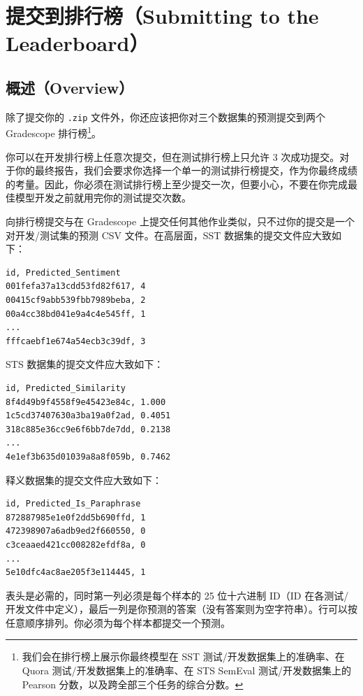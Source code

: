 \documentclass[11pt]{article}
\begin{document}
\section{提交到排行榜（Submitting to the Leaderboard）}

\subsection{概述（Overview）}

除了提交你的 \texttt{.zip} 文件外，你还应该把你对三个数据集的预测提交到两个 Gradescope 排行榜\footnote{我们会在排行榜上展示你最终模型在 SST 测试/开发数据集上的准确率、在 Quora 测试/开发数据集上的准确率、在 STS SemEval 测试/开发数据集上的 Pearson 分数，以及跨全部三个任务的综合分数。}。

你可以在开发排行榜上任意次提交，但在测试排行榜上只允许 3 次成功提交。对于你的最终报告，我们会要求你选择一个单一的测试排行榜提交，作为你最终成绩的考量。因此，你必须在测试排行榜上至少提交一次，但要小心，不要在你完成最佳模型开发之前就用完你的测试提交次数。

向排行榜提交与在 Gradescope 上提交任何其他作业类似，只不过你的提交是一个对开发/测试集的预测 CSV 文件。在高层面，SST 数据集的提交文件应大致如下：

\begin{lstlisting}[numbers=none]
id, Predicted_Sentiment
001fefa37a13cdd53fd82f617, 4
00415cf9abb539fbb7989beba, 2
00a4cc38bd041e9a4c4e545ff, 1
...
fffcaebf1e674a54ecb3c39df, 3
\end{lstlisting}

STS 数据集的提交文件应大致如下：

\begin{lstlisting}[numbers=none]
id, Predicted_Similarity
8f4d49b9f4558f9e45423e84c, 1.000
1c5cd37407630a3ba19a0f2ad, 0.4051
318c885e36cc9e6f6bb7de7dd, 0.2138
...
4e1ef3b635d01039a8a8f059b, 0.7462
\end{lstlisting}

释义数据集的提交文件应大致如下：

\begin{lstlisting}[numbers=none]
id, Predicted_Is_Paraphrase
872887985e1e0f2dd5b690ffd, 1
472398907a6adb9ed2f660550, 0
c3ceaaed421cc008282efdf8a, 0
...
5e10dfc4ac8ae205f3e114445, 1
\end{lstlisting}

表头是必需的，同时第一列必须是每个样本的 25 位十六进制 ID（ID 在各测试/开发文件中定义），最后一列是你预测的答案（没有答案则为空字符串）。行可以按任意顺序排列。你必须为每个样本都提交一个预测。
\end{document}
